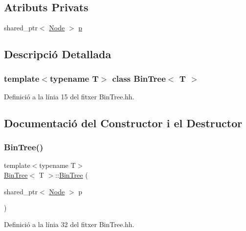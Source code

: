 \subsection*{Atributs Privats}
\begin{DoxyCompactItemize}
\item 
shared\+\_\+ptr$<$ \hyperlink{struct_bin_tree_1_1_node}{Node} $>$ \hyperlink{class_bin_tree_afe3647af1dda90f6ddf1deee6560fcf1}{p}
\end{DoxyCompactItemize}


\subsection{Descripció Detallada}
\subsubsection*{template$<$typename T$>$\newline
class Bin\+Tree$<$ T $>$}



Definició a la línia 15 del fitxer Bin\+Tree.\+hh.



\subsection{Documentació del Constructor i el Destructor}
\mbox{\label{class_bin_tree_a1408d37d1afda12d99747d09543c15f4}} 
\subsubsection{\texorpdfstring{Bin\+Tree()}{BinTree()}\hspace{0.1cm}{\footnotesize\ttfamily [1/4]}}
{\footnotesize\ttfamily template$<$typename T$>$ \\
\hyperlink{class_bin_tree}{Bin\+Tree}$<$ T $>$\+::\hyperlink{class_bin_tree}{Bin\+Tree} (\begin{DoxyParamCaption}\item[{shared\+\_\+ptr$<$ \hyperlink{struct_bin_tree_1_1_node}{Node} $>$}]{p }\end{DoxyParamCaption})\hspace{0.3cm}{\ttfamily [private]}}



Definició a la línia 32 del fitxer Bin\+Tree.\+hh.


